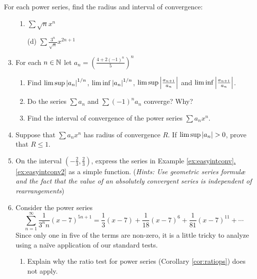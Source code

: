 \begin{exercises}
\exstart For each power series, find the radius and interval of convergence:\vspace{0pt}
\begin{enumerate}\setcounter{enumi}{1}
	\item[]\begin{enumerate}
	  \item {}
		\space {}
		\space $\displaystyle\sum\sqrt nx^n$
		\item[(d)] 
		\space {}
		\space $\displaystyle\sum\frac{3^n}{\sqrt n}x^{2n+1}$
	\end{enumerate}
  
  \item For each $n\in\mathbb{N}$ let $a_n=\left(\frac{4+2(-1)^n}{5}\right)^n$
  \begin{enumerate}
    \item Find $\limsup\left| a_n\right|^{1/n}$, $\liminf\left| a_n\right|^{1/n}$, $\limsup\left| \frac{a_{n+1}}{a_n}\right|$ and $\liminf\left| \frac{a_{n+1}}{a_n}\right|$.
    \item Do the series $\sum a_n$ and $\sum (-1)^na_n$ converge? Why?
    \item Find the interval of convergence of the power series $\sum a_nx^n$.
  \end{enumerate}
  
  \item Suppose that $\sum a_nx^n$ has radius of convergence $R$. If $\limsup\nm{a_n}>0$, prove that $R\le 1$.
  
  \item On the interval $(-\frac 23,\frac 23)$, express the series in Example \hyperref[ex:easyintconv2]{\ref*{ex:easyintconv}.\ref*{ex:easyintconv2}} as a simple function.\smallbreak
  (\emph{Hints: Use geometric series formulæ and the fact that the value of an absolutely convergent series is independent of rearrangements}) 
  
	\item Consider the power series
	\[\sum_{n=1}^\infty \frac{1}{3^nn}(x-7)^{5n+1} =\frac 13(x-7)+\frac 1{18}(x-7)^6+\frac 1{81}(x-7)^{11}+\cdots \]
	Since only one in five of the terms are non-zero, it is a little tricky to analyze using a naïve application of our standard tests.
	\begin{enumerate}
	  \item Explain why the ratio test for power series (Corollary \ref{cor:ratiops}) does not apply.
	  

\end{enumerate}
\end{enumerate}
\end{exercises}
